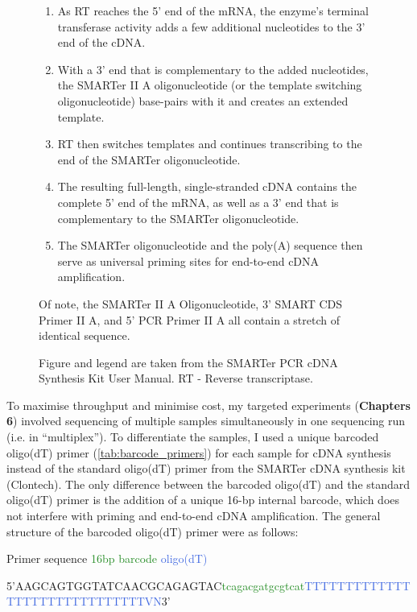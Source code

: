 \begin{figure}[htp]
{\begin{enumerate}
		\item As RT reaches the 5’ end of the mRNA, the enzyme’s terminal transferase activity adds a few additional nucleotides to the 3’ end of the cDNA.
		\item With a 3’ end that is complementary to the added nucleotides, the SMARTer II A oligonucleotide (or the template switching oligonucleotide) base-pairs with it and creates an extended template.
		\item RT then switches templates and continues transcribing to the end of the SMARTer oligonucleotide. 
		\item The resulting full-length, single-stranded cDNA contains the complete 5’ end of the mRNA, as well as a 3’ end that is complementary to the SMARTer oligonucleotide. 
		\item The SMARTer oligonucleotide and the poly(A) sequence then serve as universal priming sites for end-to-end cDNA amplification.
		\\
		
	\end{enumerate}
	Of note, the SMARTer II A Oligonucleotide, 3’ SMART CDS Primer II A, and 5’ PCR Primer II A all contain a stretch of identical sequence.  

	Figure and legend are taken from the SMARTer PCR cDNA Synthesis Kit User Manual\cite{LaboratoriesInc}. RT - Reverse transcriptase.
	}
	\label{fig:cDNAsynthesis_workflow}
\end{figure}

\clearpage
To maximise throughput and minimise cost, my targeted experiments (\textbf{Chapters 6}) involved sequencing of multiple samples simultaneously in one sequencing run (i.e. in “multiplex”). To differentiate the samples, I used a unique barcoded oligo(dT) primer (\cref{tab:barcode_primers}) for each sample for cDNA synthesis instead of the standard oligo(dT) primer from the SMARTer cDNA synthesis kit (Clontech). The only difference between the barcoded oligo(dT) and the standard oligo(dT) primer is the addition of a unique 16-bp internal barcode, which does not interfere with priming and end-to-end cDNA amplification. The general structure of the barcoded oligo(dT) primer were as follows:

\vspace{0.5cm}
\hspace{2cm} \textcolor{RedOrange}{Primer sequence} \hspace{0.8cm}   \textcolor{ForestGreen}{16bp barcode}   \hspace{3cm} \textcolor{RoyalBlue}{oligo(dT)}
\vspace{-1.2cm}
\begin{center}
	\footnotesize{5'\textcolor{RedOrange}{AAGCAGTGGTATCAACGCAGAGTAC}\textcolor{ForestGreen}{tcagacgatgcgtcat}\textcolor{RoyalBlue}{TTTTTTTTTTTTTTTTTTTTTTTTTTTTTTVN}3’}
\end{center}

